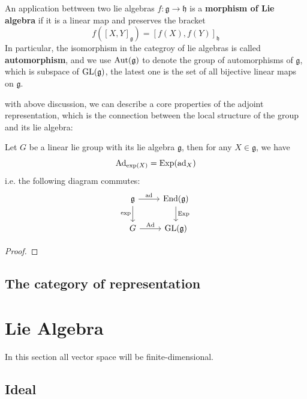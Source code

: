 \begin{remark}
    An application bettween two lie algebras \(f: \mathfrak{g} \to \mathfrak{h}\) is a \textbf{morphism of Lie algebra} if it is a linear map and preserves the bracket \[f([X,Y]_{\mathfrak{g}}) = [f(X), f(Y)]_{\mathfrak{h}}\]
    In particular, the isomorphism in the categroy of lie algebras is called \textbf{automorphism}, and we use \(\operatorname{Aut}(\mathfrak{g})\) to denote the group of automorphisms of \(\mathfrak{g}\), which is subspace of \(\operatorname{GL}(\mathfrak{g})\), the latest one is the set of all bijective linear maps on \(\mathfrak{g}\). 
\end{remark}

with above discussion, we can describe a core properties of the adjoint representation, which is the connection between the local structure of the group and its lie algebra:

\begin{colortheorem}
    Let \(G\) be a linear lie group with its lie algebra \(\mathfrak{g}\), then for any \(X \in \mathfrak{g}\), we have \[\operatorname{Ad}_{\exp(X)} = \operatorname{Exp}(\operatorname{ad}_X)\]
    i.e. the following diagram commutes:
    \[
\begin{tikzcd}
\mathfrak g \arrow[r, "\ad"] \arrow[d, "\exp"'] 
& \End(\mathfrak g) \arrow[d, "\Exp"] \\
G \arrow[r, "\Ad"] 
& \GL(\mathfrak g)
\end{tikzcd}
\]
\end{colortheorem}

\begin{proof}
    
\end{proof}

\subsection{The category of representation}





\newpage

\section{Lie Algebra}

In this section all vector space will be finite-dimensional.

\subsection{Ideal}


